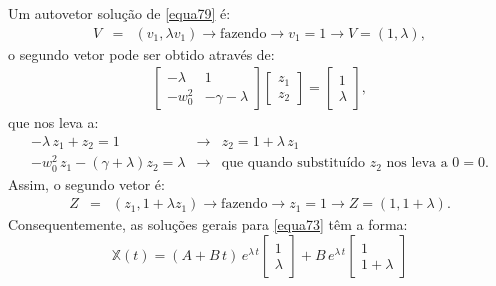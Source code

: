 \documentclass[12pt,openright,twoside,english,brazil]{abntex2}
\begin{document}
 Um autovetor solução de \ref{equa79} é:
\begin{eqnarray}
 V & = & (v_1,\lambda v_1) \rightarrow \text{fazendo} \rightarrow v_1 = 1 \rightarrow V = (1,\lambda),
 \label{equa107}
\end{eqnarray}
o segundo vetor pode ser obtido através de:
\begin{eqnarray}
 \begin{bmatrix}
  -\lambda & 1 \\
  -w_0^2 & -\gamma -\lambda
  \end{bmatrix} \begin{bmatrix}
                 z_1 \\
                 z_2
                 \end{bmatrix} = \begin{bmatrix}
                                  1 \\
                                  \lambda
                                  \end{bmatrix},
 \label{equa108}
\end{eqnarray}
que nos leva a:
\begin{eqnarray}
 -\lambda\, z_1 + z_2 = 1 & \rightarrow & z_2 = 1 + \lambda \, z_1 \\
 -w_0^2 \, z_1 - (\gamma + \lambda) z_2 = \lambda & \rightarrow & \text{que quando substituído $z_2$ nos leva a $0=0$.} \nonumber
 \label{equa109} 
\end{eqnarray}
Assim, o segundo vetor é:
\begin{eqnarray}
 Z & = & (z_1,1+\lambda z_1) \rightarrow \text{fazendo} \rightarrow z_1 = 1 \rightarrow Z =(1,1+\lambda).
 \label{equa110}
\end{eqnarray}
Consequentemente, as soluções gerais para \ref{equa73} têm a forma:
\begin{equation}
 \mathbb{X}(t) = (A + B\, t)\, e^{\lambda\, t} \begin{bmatrix}
                                             1 \\
                                             \lambda
                                             \end{bmatrix} + B\, e^{\lambda\, t} \begin{bmatrix}
                                              1 \\
                                              1 + \lambda
                                             \end{bmatrix}
 \label{equa111}
\end{equation}
\end{document}

